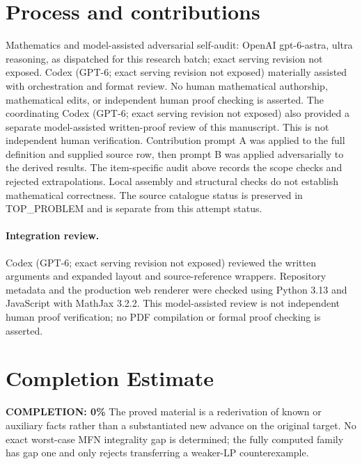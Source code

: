 \documentclass[11pt]{article}
\begin{document}
\section{Process and contributions}
Mathematics and model-assisted adversarial self-audit: OpenAI gpt-6-astra, ultra reasoning, as dispatched for this research batch; exact serving revision not exposed. Codex (GPT-6; exact serving revision not exposed) materially assisted with orchestration and format review. No human mathematical authorship, mathematical edits, or independent human proof checking is asserted.
The coordinating Codex (GPT-6; exact serving revision not exposed) also provided a separate model-assisted written-proof review of this manuscript. This is not independent human verification.
Contribution prompt A was applied to the full definition and supplied source row, then prompt B was applied adversarially to the derived results. The item-specific audit above records the scope checks and rejected extrapolations. Local assembly and structural checks do not establish mathematical correctness. The source catalogue status is preserved in TOP\_PROBLEM and is separate from this attempt status.
\paragraph{Integration review.} Codex (GPT-6; exact serving revision not exposed) reviewed the written arguments and expanded layout and source-reference wrappers. Repository metadata and the production web renderer were checked using Python 3.13 and JavaScript with MathJax 3.2.2. This model-assisted review is not independent human proof verification; no PDF compilation or formal proof checking is asserted.

\section{Completion Estimate}
\noindent\textbf{COMPLETION: 0\%}
The proved material is a rederivation of known or auxiliary facts rather than a substantiated new advance on the original target. No exact worst-case MFN integrality gap is determined; the fully computed family has gap one and only rejects transferring a weaker-LP counterexample.
\end{document}
